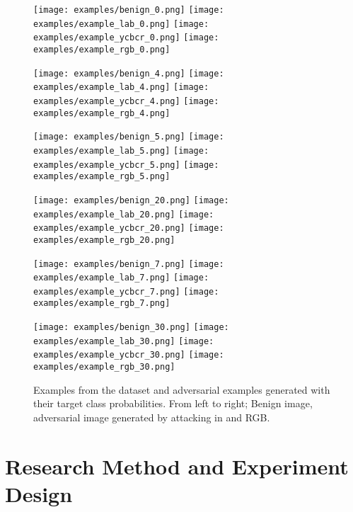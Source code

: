 \begin{figure}[h]
    \texttt{[image: examples/benign\_0.png]}
    \texttt{[image: examples/example\_lab\_0.png]}
    \texttt{[image: examples/example\_ycbcr\_0.png]}
    \texttt{[image: examples/example\_rgb\_0.png]}

    \texttt{[image: examples/benign\_4.png]}
    \texttt{[image: examples/example\_lab\_4.png]}
    \texttt{[image: examples/example\_ycbcr\_4.png]}
    \texttt{[image: examples/example\_rgb\_4.png]}

    \texttt{[image: examples/benign\_5.png]}
    \texttt{[image: examples/example\_lab\_5.png]}
    \texttt{[image: examples/example\_ycbcr\_5.png]}
    \texttt{[image: examples/example\_rgb\_5.png]}

    \texttt{[image: examples/benign\_20.png]}
    \texttt{[image: examples/example\_lab\_20.png]}
    \texttt{[image: examples/example\_ycbcr\_20.png]}
    \texttt{[image: examples/example\_rgb\_20.png]}

    \texttt{[image: examples/benign\_7.png]}
    \texttt{[image: examples/example\_lab\_7.png]}
    \texttt{[image: examples/example\_ycbcr\_7.png]}
    \texttt{[image: examples/example\_rgb\_7.png]}

    \texttt{[image: examples/benign\_30.png]}
    \texttt{[image: examples/example\_lab\_30.png]}
    \texttt{[image: examples/example\_ycbcr\_30.png]}
    \texttt{[image: examples/example\_rgb\_30.png]}


    \caption{Examples from the dataset and adversarial examples generated with their target class probabilities. From left to right; Benign image, adversarial image generated by attacking in  and RGB. }\label{fig:visualprob}
\end{figure}
\section{Research Method and Experiment Design}
